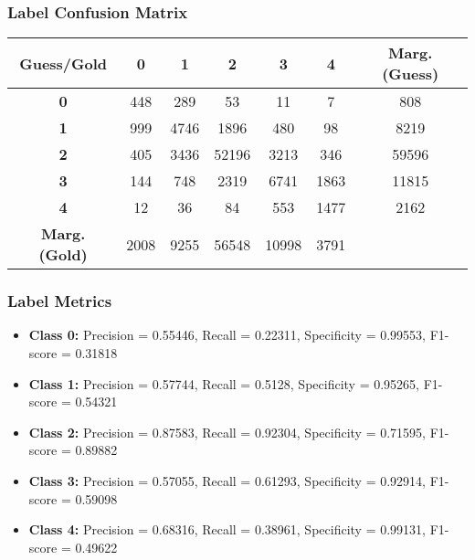 \subsubsection{Label Confusion Matrix}
\begin{table}[h]
\centering
\begin{tabular}{c|ccccc|c}
\textbf{Guess/Gold} & \textbf{0} & \textbf{1} & \textbf{2} & \textbf{3} & \textbf{4} & \textbf{Marg. (Guess)} \\
\hline
\textbf{0} & 448 & 289 & 53 & 11 & 7 & 808 \\
\textbf{1} & 999 & 4746 & 1896 & 480 & 98 & 8219 \\
\textbf{2} & 405 & 3436 & 52196 & 3213 & 346 & 59596 \\
\textbf{3} & 144 & 748 & 2319 & 6741 & 1863 & 11815 \\
\textbf{4} & 12 & 36 & 84 & 553 & 1477 & 2162 \\
\hline
\textbf{Marg. (Gold)} & 2008 & 9255 & 56548 & 10998 & 3791 & \\
\end{tabular}
\end{table}

\subsubsection{Label Metrics}
\begin{itemize}
    \item \textbf{Class 0:} Precision = 0.55446, Recall = 0.22311, Specificity = 0.99553, F1-score = 0.31818
    \item \textbf{Class 1:} Precision = 0.57744, Recall = 0.5128, Specificity = 0.95265, F1-score = 0.54321
    \item \textbf{Class 2:} Precision = 0.87583, Recall = 0.92304, Specificity = 0.71595, F1-score = 0.89882
    \item \textbf{Class 3:} Precision = 0.57055, Recall = 0.61293, Specificity = 0.92914, F1-score = 0.59098
    \item \textbf{Class 4:} Precision = 0.68316, Recall = 0.38961, Specificity = 0.99131, F1-score = 0.49622
\end{itemize}

